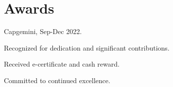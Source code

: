 \documentclass[]{deedy-resume-openfont}
\begin{document}
\begin{minipage}[t]{0.66\textwidth}



\section{Awards}
\sectionsep
\begin{tightemize}
\item Capgemini, Sep-Dec 2022.
\item Recognized for dedication and significant contributions.
\item Received e-certificate and cash reward.
\item Committed to continued excellence.
\end{tightemize}
%
%


\end{minipage}%
\hfill
\end{document}

